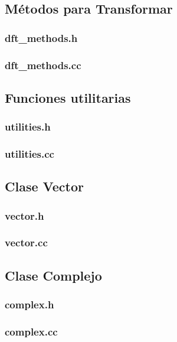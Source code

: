 \documentclass{article}
\begin{document}
  \subsection{Métodos para Transformar}
    \subsubsection{dft\_methods.h}
      
    \subsubsection{dft\_methods.cc}
      

  \subsection{Funciones utilitarias}
    \subsubsection{utilities.h}
      
    \subsubsection{utilities.cc}
      
      
  \subsection{Clase Vector}
    \subsubsection{vector.h}
      
    \subsubsection{vector.cc}
      
      
  \subsection{Clase Complejo}
    \subsubsection{complex.h}
      
    \subsubsection{complex.cc}
      
            
\end{document}
